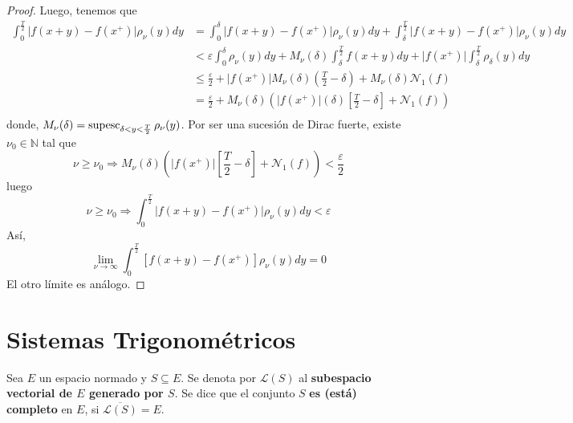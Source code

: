 \documentclass[12pt]{report}
\theoremstyle{largebreak}
\newcommand\abs[1]{\ensuremath{\big|#1\big|}}
\newcommand{\N}[2]{\ensuremath{\mathcal{N}_{#1}\left(#2\right)}}
\newcommand{\Cls}[1]{\ensuremath{\overline{#1}}}
\newcommand{\supesc}[1]{\ensuremath{\mathop{\textup{supesc}}_{#1}}}
\begin{document}
\begin{proof}
        Luego, tenemos que
        \begin{equation*}
            \begin{split}
                \int_0^{\frac{T}{2}}\abs{f(x+y)-f(x^+)} \rho_\nu(y)dy&=\int_0^{\delta}\abs{f(x+y)-f(x^+)}\rho_\nu(y)dy+\int_{\delta}^{\frac{T}{2}}\abs{f(x+y)-f(x^+)}\rho_\nu(y)dy\\
                &<\varepsilon\int_0^{\delta}\rho_\nu(y)dy+M_\nu(\delta)\int_{\delta}^{\frac{T}{2}}f(x+y)dy+\abs{f(x^+)}\int_{\delta}^{\frac{T}{2}}\rho_\delta(y)dy\\
                &\leq \frac{\varepsilon}{2}+\abs{f(x^+)}M_\nu(\delta)\left(\frac{T}{2}-\delta \right)+M_\nu(\delta)\N{1}{f}\\
                &= \frac{\varepsilon}{2}+M_\nu(\delta)\left(\abs{f(x^+)}(\delta)\left[\frac{T}{2}-\delta\right]+\N{1}{f} \right) \\
            \end{split}
        \end{equation*}
        donde, $M_\nu(\delta)=\supesc{\delta<y<\frac{T}{2}}\rho_\nu(y)$. Por ser una sucesión de Dirac fuerte, existe $\nu_0\in\mathbb{N}$ tal que
        \begin{equation*}
            \nu\geq\nu_0\Rightarrow M_\nu(\delta)\left(\abs{f(x^+)}\left[\frac{T}{2}-\delta\right]+\N{1}{f}\right)<\frac{\varepsilon}{2}
        \end{equation*}
        luego
        \begin{equation*}
            \nu\geq\nu_0\Rightarrow \int_0^{\frac{T}{2}}\abs{f(x+y)-f(x^+)} \rho_\nu(y)dy<\varepsilon
        \end{equation*}
        Así,
        \begin{equation*}
            \lim_{\nu\rightarrow\infty}\int_0^{\frac{T}{2}}\left[f(x+y)-f(x^+)\right]\rho_\nu(y)dy=0
        \end{equation*}
        El otro límite es análogo.
    \end{proof}

    \section{Sistemas Trigonométricos}

    \begin{mydef}
        Sea $E$ un espacio normado y $S\subseteq E$. Se denota por $\mathcal{L}(S)$ al \textbf{subespacio vectorial de $E$ generado por $S$}. Se dice que el conjunto $S$ \textbf{es (está) completo} en $E$, si $\Cls{\mathcal{L}(S)}=E$.
    \end{mydef}
\end{document}
